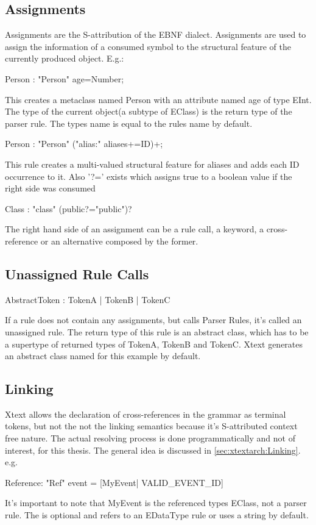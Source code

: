 \subsection{Assignments}
Assignments are the S-attribution of the EBNF dialect. Assignments are used to assign the information of a consumed symbol to the structural feature of the currently produced object. E.g.:
\begin{xtxt}
Person : "Person" age=Number;
\end{xtxt}
This creates a metaclass named Person with an attribute named age of type EInt. 
The type of the current object(a subtype of EClass) is the return type of the parser rule. The types name is equal to the rules name by default.
\begin{xtxt}
Person : "Person" ("alias:" aliases+=ID)+;
\end{xtxt}
This rule creates a multi-valued structural feature for aliases and adds each ID occurrence to it. Also '?=' exists which assigns true to a boolean value if the right side was consumed
\begin{xtxt}
Class : "class" (public?="public")?
\end{xtxt}

The right hand side of an assignment can be a rule call, a keyword, a cross-reference or an alternative composed by the former.

\subsection{Unassigned Rule Calls}
\begin{xtxt}
AbstractToken :	TokenA |	TokenB |	TokenC
\end{xtxt}
If a rule does not contain any assignments, but calls Parser Rules, it's called an unassigned rule. The return type of this rule is an abstract class, which has to be a supertype of returned types of TokenA, TokenB and TokenC. Xtext generates an abstract class named  for this example by default.

\subsection{Linking}
Xtext allows the declaration of cross-references in the grammar as terminal tokens, but not the not the linking semantics because it's S-attributed context free nature. The actual resolving process is done programmatically and not of interest, for this thesis. The general idea is discussed in \ref{sec:xtextarch:Linking}.
e.g. 
\begin{xtxt}
Reference:  "Ref" event = [MyEvent| VALID_EVENT_ID]
\end{xtxt}
It's important to note that MyEvent is the referenced types EClass, not a parser rule. The   is optional and refers to an EDataType rule or uses a string by default.

